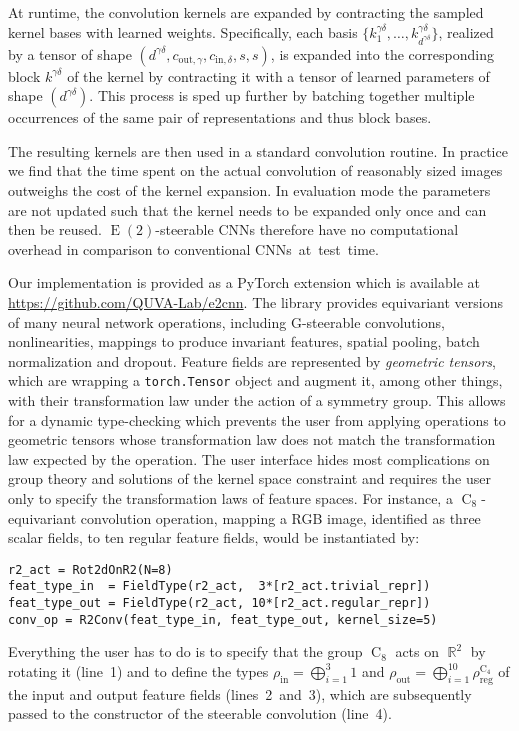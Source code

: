 \documentclass{article}
\DeclareMathOperator*{\R}{\mathbb{R}}
\newcommand{\E}[1]{\ensuremath{\operatorname{E}(#1)}}
\newcommand{\C}[1]{\ensuremath{\operatorname{C}_{#1}}}
\begin{document}
At runtime, the convolution kernels are expanded by contracting the sampled kernel bases with learned weights.
Specifically, each basis
$\big\{k^{\gamma\delta}_1,\dots,k^{\gamma\delta}_{d^{\gamma\delta}}\big\}$,
realized by a tensor of shape $(d^{\gamma\delta}, c_{\text{out},\gamma}, c_{\text{in},\delta}, s, s)$,
is expanded into the corresponding block $k^{\gamma\delta}$ of the kernel by contracting it with a tensor of learned parameters of shape $(d^{\gamma\delta})$.
This process is sped up further by batching together multiple occurrences of the same pair of representations and thus block bases.

The resulting kernels are then used in a standard convolution routine.
In practice we find that the time spent on the actual convolution of reasonably sized images outweighs the cost of the kernel expansion.
In evaluation mode the parameters are not updated such that the kernel needs to be expanded only once and can then be reused.
$\E2$-steerable CNNs therefore have no computational overhead in comparison to conventional CNNs~at~test~time.

Our implementation is provided as a PyTorch extension which is available at 
\url{https://github.com/QUVA-Lab/e2cnn}.
The library provides equivariant versions of many neural network operations, including G-steerable convolutions, nonlinearities, mappings to produce invariant features, spatial pooling, batch normalization and dropout.
Feature fields are represented by \textit{geometric tensors}, which are wrapping a \texttt{torch.Tensor} object and augment it, among other things, with their transformation law under the action of a symmetry group.
This allows for a dynamic type-checking which prevents the user from applying operations to geometric tensors whose transformation law does not match the transformation law expected by the operation.
The user interface hides most complications on group theory and solutions of the kernel space constraint and requires the user only to specify the transformation laws of feature spaces.
For instance, a $\C8$-equivariant convolution operation, mapping a RGB image, identified as three scalar fields, to ten regular feature fields, would be instantiated by:
\begin{center}
\begin{minipage}{.75\linewidth}
\begin{lstlisting}[style=mymatstyle]
r2_act = Rot2dOnR2(N=8)
feat_type_in  = FieldType(r2_act,  3*[r2_act.trivial_repr])
feat_type_out = FieldType(r2_act, 10*[r2_act.regular_repr])
conv_op = R2Conv(feat_type_in, feat_type_out, kernel_size=5)
\end{lstlisting}
\end{minipage}
\end{center}
Everything the user has to do is to specify that the group $\C8$ acts on $\R^2$ by rotating it (line~1) and to define the types $\rho_\text{in}=\bigoplus_{i=1}^3 1$ and $\rho_\text{out}=\bigoplus_{i=1}^{10}\rho_\text{reg}^{\C4}$ of the input and output feature fields (lines~2~and~3), which are subsequently passed to the constructor of the steerable convolution (line~4).
 	
\end{document}

